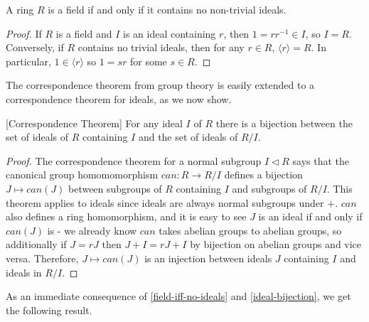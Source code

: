\begin{lemma}\label{field-iff-no-ideals}
A ring $R$ is a field if and only if it contains no non-trivial ideals.
\end{lemma}
\begin{proof}
If $R$ is a field and $I$ is an ideal containing $r$, then $1=rr^{-1}\in I$, so $I=R$. Conversely, if $R$ contains no trivial ideals, then for any $r\in R$, $\langle r \rangle = R$. In particular, $1\in \langle r \rangle$ so $1=sr$ for some $s\in R$.
\end{proof}

The correspondence theorem from group theory \cite{GroupTheory} is easily extended to a correspondence theorem for ideals, as we now show.
\begin{lemma}\label{ideal-bijection}[Correspondence Theorem]
For any ideal $I$ of $R$ there is a bijection between the set of ideals of $R$ containing $I$ and the set of ideals of $R/I$.
\end{lemma}
\begin{proof}
The correspondence theorem for a normal subgroup $I\triangleleft R$ says that the canonical group homomomorphism $can:R\rightarrow R/I$ defines a bijection $J\mapsto can(J)$ between subgroups of $R$ containing $I$ and subgroups of $R/I$. This theorem applies to ideals since ideals are always normal subgroups under $+$. $can$ also defines a ring homomorphism, and it is easy to see $J$ is an ideal if and only if $can(J)$ is - we already know $can$ takes abelian groups to abelian groups, so additionally if $J=rJ$ then $J+I=rJ+I$ by bijection on abelian groups and vice versa. Therefore, $J\mapsto can(J)$ is an injection between ideals $J$ containing $I$ and ideals in $R/I$. 
\end{proof} As an immediate consequence of \cref{field-iff-no-ideals} and \cref{ideal-bijection}, we get the following result.


